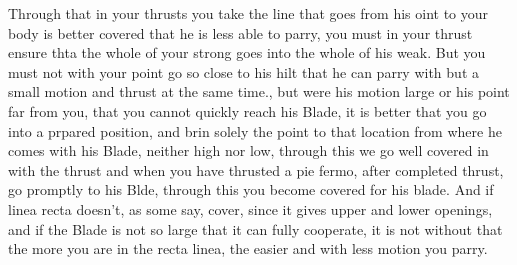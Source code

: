 \newpage


\newpage



Through that in your thrusts you take the line that goes from his oint
to your body is better covered that he is less able to parry, you must
in your thrust ensure thta the whole of your strong goes into the
whole of his weak. But you must not with your point go so close to his
hilt that he can parry with but a small motion and thrust at the same
time., but were his motion large or his point far from you, that you
cannot quickly reach his Blade, it is better that you go into a
prpared position, and brin solely the point to that location from
where he comes with his Blade, neither high nor low, through this we
go well covered in with the thrust and when you have thrusted a pie
fermo, after completed thrust, go promptly to his Blde, through this
you become covered for his blade. And if linea recta doesn't, as some
say, cover, since it gives upper and lower openings, and if the Blade
is not so large that it can fully cooperate, it is not without that
the more you are in the recta linea, the easier and with less motion
you parry.


